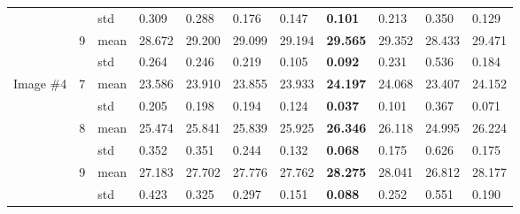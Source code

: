 \documentclass[conference]{IEEEtran}
\begin{document}
\begin{table*}
\begin{tabularx}{\textwidth}{|X|X|X|X|X|X|X|X|X|X|X|}
& & std & 0.309 & 0.288 & 0.176 & 0.147 & \textbf{0.101} & 0.213 & 0.350 & 0.129 \\ \cline{2-11} 
& \multirow{2}{*}{9} & mean & 28.672 & 29.200 & 29.099 & 29.194 & \textbf{29.565} & 29.352 & 28.433 & 29.471\\ \cline{3-11} 
& & std & 0.264 & 0.246 & 0.219 & 0.105 & \textbf{0.092} & 0.231 & 0.536 & 0.184\\ \hline
\multirow{6}{*}{Image \#4} & \multirow{2}{*}{7} & mean & 23.586 & 23.910 & 23.855 & 23.933 & \textbf{24.197} & 24.068 & 23.407 & 24.152\\ \cline{3-11} 
& & std & 0.205 & 0.198 & 0.194 & 0.124 & \textbf{0.037} & 0.101 & 0.367 & 0.071 \\ \cline{2-11} 
& \multirow{2}{*}{8} & mean & 25.474 & 25.841 & 25.839 & 25.925 & \textbf{26.346} & 26.118 & 24.995 & 26.224 \\ \cline{3-11} 
& & std & 0.352 & 0.351 & 0.244 & 0.132 &  \textbf{0.068} & 0.175 & 0.626 & 0.175\\ \cline{2-11} 
& \multirow{2}{*}{9} & mean &27.183 & 27.702 & 27.776 & 27.762 & \textbf{28.275} & 28.041 & 26.812 & 28.177 \\ \cline{3-11} 
& & std &0.423 & 0.325 & 0.297 & 0.151 & \textbf{0.088} & 0.252 & 0.551 & 0.190\\ \hline
\end{tabularx}
\label{tab:anexoA}
\end{table*}
\end{document}
